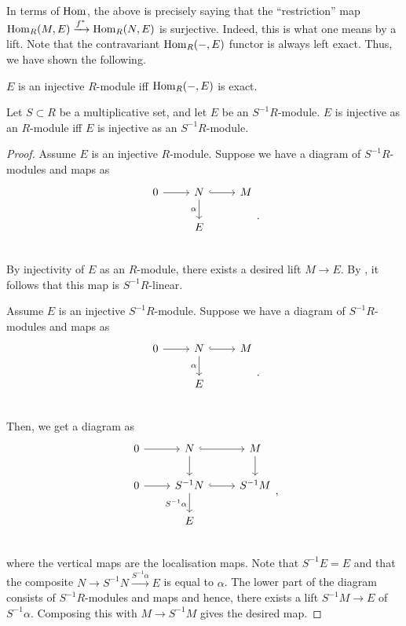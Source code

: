 In terms of $\operatorname{Hom}$, the above is precisely saying that the ``restriction'' map $\operatorname{Hom}_{R}(M, E) \xrightarrow{f^{\ast}} \operatorname{Hom}_{R}(N, E)$ is surjective. Indeed, this is what one means by a lift. Note that the contravariant $\operatorname{Hom}_{R}(-, E)$ functor is always left exact. Thus, we have shown the following.

\begin{prop}
	$E$ is an injective $R$-module iff $\operatorname{Hom}_{R}(-, E)$ is exact.
\end{prop}

\begin{prop} \label{prop:injective-over-localisation}
	Let $S \subset R$ be a multiplicative set, and let $E$ be an $S^{-1}R$-module. $E$ is injective as an $R$-module iff $E$ is injective as an $S^{-1}R$-module.
\end{prop}
\begin{proof} 
	\forward Assume $E$ is an injective $R$-module. Suppose we have a diagram of $S^{-1}R$-modules and maps as
	\begin{equation*} 
		\begin{tikzcd}
			0 \arrow[r] & N \arrow[d, "\alpha"'] \arrow[r, hook] & M \\
			  & E & \\
		\end{tikzcd}.
	\end{equation*}
	By injectivity of $E$ as an $R$-module, there exists a desired lift $M \to E$. By , it follows that this map is $S^{-1}R$-linear.

	\backward Assume $E$ is an injective $S^{-1}R$-module. Suppose we have a diagram of $S^{-1}R$-modules and maps as
	\begin{equation*} 
		\begin{tikzcd}
			0 \arrow[r] & N \arrow[d, "\alpha"'] \arrow[r, hook] & M \\
			  & E & \\
		\end{tikzcd}.
	\end{equation*}
	Then, we get a diagram as
	\begin{equation*} 
		\begin{tikzcd}
			0 \arrow[r] & N \arrow[d] \arrow[r, hook] & M \arrow[d] \\
			0 \arrow[r] & S^{-1} N \arrow[d, "S^{-1}\alpha"'] \arrow[r, hook] & S^{-1} M \\
			  & E & \\
		\end{tikzcd},
	\end{equation*}
	where the vertical maps are the localisation maps. Note that $S^{-1}E = E$ and that the composite $N \to S^{-1}N \xrightarrow{S^{-1}\alpha} E$ is equal to $\alpha$. The lower part of the diagram consists of $S^{-1}R$-modules and maps and hence, there exists a lift $S^{-1}M \to E$ of $S^{-1}\alpha$. Composing this with $M \to S^{-1}M$ gives the desired map.
\end{proof}

